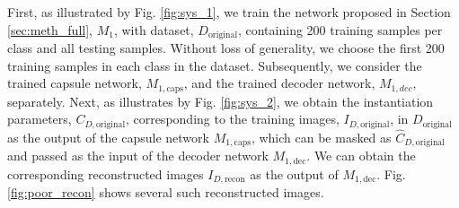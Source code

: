 
First, as illustrated by Fig. \ref{fig:sys_1}, we train the network proposed in Section \ref{sec:meth_full}, $M_1$, with dataset, $D_{\mathrm{original}}$, containing 200 training samples per class and all testing samples. Without loss of generality, we choose the first 200 training samples in each class in the dataset. Subsequently, we consider the trained capsule network, $M_{1,\mathrm{caps}}$, and the trained decoder network, $M_{1,dec}$, separately. Next, as illustrates by Fig. \ref{fig:sys_2}, we obtain the instantiation parameters, $C_{D,\mathrm{original}}$, corresponding to the training images, $I_{D,\mathrm{original}}$, in $D_{\mathrm{original}}$ as the output of the capsule network $M_{1,\mathrm{caps}}$, which can be masked as $\widehat{C}_{D,\mathrm{original}}$ and passed as the input of the decoder network $M_{1,\mathrm{dec}}$. We can obtain the corresponding reconstructed images $I_{D,\mathrm{recon}}$ as the output of $M_{1,\mathrm{dec}}$. Fig. \ref{fig:poor_recon} shows several such reconstructed images.

